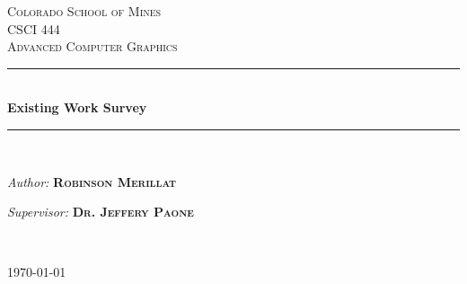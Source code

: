 \documentclass[12pt]{article}
\begin{document}
\begin{titlepage}

\newcommand{\HRule}{\rule{\linewidth}{0.5mm}} %

\center %
 

\textsc{\LARGE Colorado School of Mines}\\[1.5cm] %
\textsc{\Large CSCI 444}\\[0.5cm] %
\textsc{\large Advanced Computer Graphics}\\[0.5cm] %


\HRule \\[0.6cm]
{ \huge \bfseries Existing Work Survey}\\[0.4cm] %
\HRule \\[1.0cm]
 

\begin{minipage}{0.4\textwidth}
    \begin{flushleft}
        \emph{Author:}  
        \medskip
        {\textsc{\textbf{Robinson Merillat }}}   %
    \end{flushleft}
\end{minipage}
\begin{minipage}{0.45\textwidth}
    \begin{flushright} \large
        \emph{Supervisor:}
        {\textsc{\textbf{Dr. Jeffery Paone }}} %
    \end{flushright}
\end{minipage}\\[1cm]

\begin{center}
{\large \today}
\end{center}


\end{titlepage}
\end{document}

